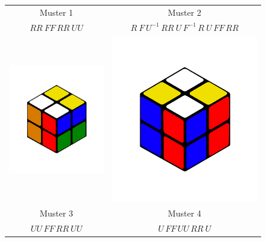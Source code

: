 \documentclass[12pt,a4paper, usenames, dvipsnames]{article}
\theoremstyle{mystyle}
\theoremstyle{definition}
\begin{document}
\begin{figure}[h]
\begin{tabular}{cc}
Muster 1 & Muster 2 \\
$RR \ FF \, RR \ UU$ &  $R \ F \, U^{-1} \, RR \ U \, F^{-1} \, R \ U \, FF \, RR$ \\
\includegraphics[scale=0.1]{UUFFRRUU.png} &  \includegraphics[scale=0.1]{UFFUURRU.png} \\
Muster 3 & Muster 4 \\
$UU \, FF \, RR \ UU$ &  $U \, FF \, UU \, RR \ U$ \\
\end{tabular}


\end{figure}
\end{document}
